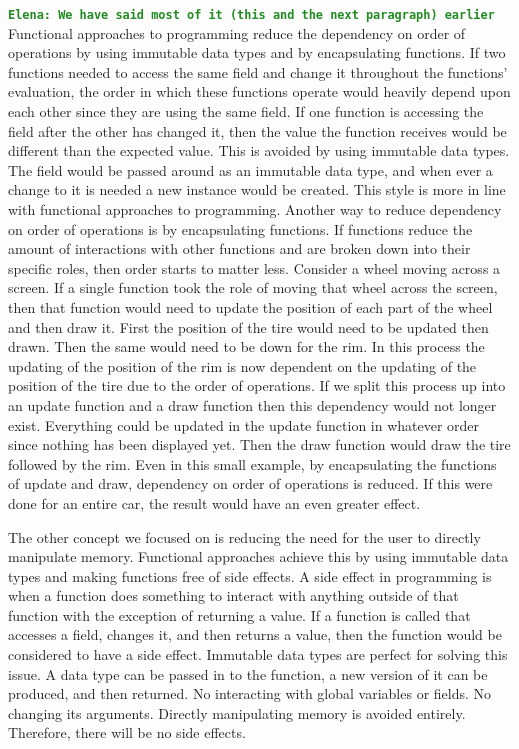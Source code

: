 \documentclass[12pt]{article}
\newcommand{\comment}[1]{{\bf \tt  {#1}}}
\newcommand{\emcomment}[1]{\textcolor{ForestGreen}{\comment{Elena: {#1}}}}
\begin{document}
\emcomment{We have said most of it (this and the next paragraph) earlier}
Functional approaches to programming reduce the dependency on order of operations by using immutable data types and by encapsulating functions. If two functions needed to access the same field and change it throughout the functions' evaluation, the order in which these functions operate would heavily depend upon each other since they are using the same field. If one function is accessing the field after the other has changed it, then the value the function receives would be different than the expected value. This is avoided by using immutable data types. The field would be passed around as an immutable data type, and when ever a change to it is needed a new instance would be created. This style is more in line with functional approaches to programming. Another way to reduce dependency on order of operations is by encapsulating functions. If functions reduce the amount of interactions with other functions and are broken down into their specific roles, then order starts to matter less. Consider a wheel moving across a screen. If a single function took the role of moving that wheel across the screen, then that function would need to update the position of each part of the wheel and then draw it. First the position of the tire would need to be updated then drawn. Then the same would need to be down for the rim. In this process the updating of the position of the rim is now dependent on the updating of the position of the tire due to the order of operations. If we split this process up into an update function and a draw function then this dependency would not longer exist. Everything could be updated in the update function in whatever order since nothing has been displayed yet. Then the draw function would draw the tire followed by the rim. Even in this small example, by encapsulating the functions of update and draw, dependency on order of operations is reduced. If this were done for an entire car, the result would have an even greater effect.

The other concept we focused on is reducing the need for the user to directly manipulate memory. Functional approaches achieve this by using immutable data types and making functions free of side effects. A side effect in programming is when a function does something to interact with anything outside of that function with the exception of returning a value. If a function is called that accesses a field, changes it, and then returns a value, then the function would be considered to have a side effect. Immutable data types are perfect for solving this issue. A data type can be passed in to the function, a new version of it can be produced, and then returned. No interacting with global variables or fields. No changing its arguments. Directly manipulating memory is avoided entirely. Therefore, there will be no side effects. 
\end{document}
